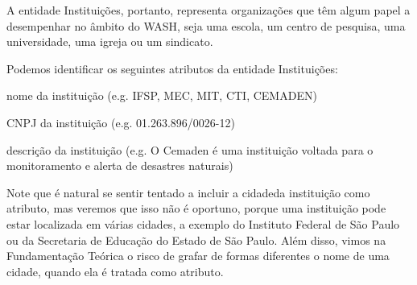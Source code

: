\documentclass[
12pt,		%
openright,	%
twoside,  %
a4paper,			%
chapter=TITLE,		%
english,			%
french,				%
spanish,			%
brazil				%
]{USPSC-classe/USPSC}
\begin{document}
\noindent\begin{center}\mbox{\centering{}}\end{center}


A entidade \textquotedbl Institui\c{c}\~oes\textquotedbl , portanto, representa organiza\c{c}\~oes que t\^em algum papel a desempenhar no \^ambito do WASH, seja uma escola, um centro de pesquisa, uma universidade, uma igreja ou um sindicato.














Podemos identificar os seguintes atributos da entidade \textquotedbl Institui\c{c}\~oes\textquotedbl :















\begin{alineas}
\item nome da institui\c{c}\~ao (e.g. IFSP, MEC, MIT, CTI, CEMADEN)
\item CNPJ da institui\c{c}\~ao (e.g.  01.263.896/0026-12)
\item descri\c{c}\~ao da institui\c{c}\~ao (e.g. \textquotedbl O Cemaden \'e uma institui\c{c}\~ao voltada para o monitoramento e alerta de desastres naturais\textquotedbl )
\end{alineas}

Note que \'e natural se sentir tentado a incluir a \textquotedbl cidade\textquotedbl  da institui\c{c}\~ao como atributo, mas veremos que isso n\~ao \'e oportuno, porque uma institui\c{c}\~ao pode estar localizada em v\'arias cidades, a exemplo do Instituto Federal de S\~ao Paulo ou da Secretaria de Educa\c{c}\~ao do Estado de S\~ao Paulo. Al\'em disso, vimos na Fundamenta\c{c}\~ao Te\'orica o risco de grafar de formas diferentes o nome de uma cidade, quando ela \'e tratada como atributo.
\end{document}
